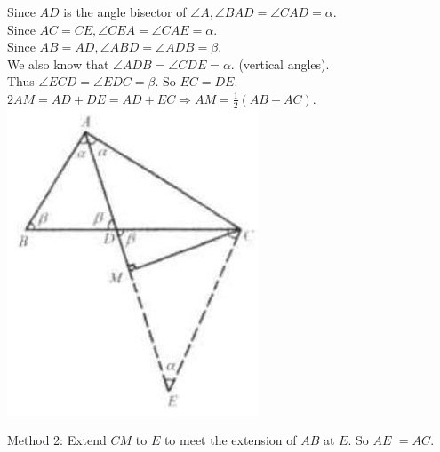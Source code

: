 \documentclass{article}
\begin{document}
Since \(A D\) is the angle bisector of \(\angle A, \angle B A D=\angle C A D=\alpha\).\\
Since \(A C=C E, \angle C E A=\angle C A E=\alpha\).\\
Since \(A B=A D, \angle A B D=\angle A D B=\beta\).\\
We also know that \(\angle A D B=\angle C D E=\alpha\). (vertical angles).\\
Thus \(\angle E C D=\angle E D C=\beta\). So \(E C=D E\).\\
\(2 A M=A D+D E=A D+E C \Rightarrow A M=\frac{1}{2}(A B+A C)\).\\
\centering
\includegraphics[width=\textwidth]{images/058(1).jpg}

Method 2:
Extend \(C M\) to \(E\) to meet the extension of \(A B\) at \(E\). So \(A E\) \(=A C\).
\end{document}
